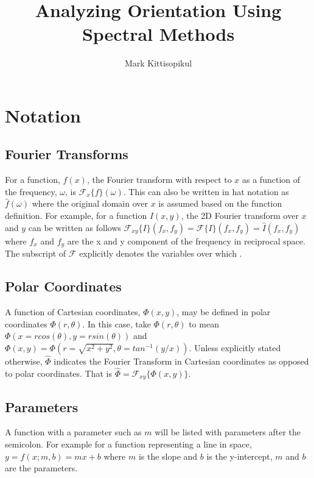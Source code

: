 \documentclass{article}
\title{Analyzing Orientation Using Spectral Methods}
\author{Mark Kittisopikul}
\begin{document}
\maketitle

\section{Notation}
\subsection{Fourier Transforms}
For a function, $f(x)$, the Fourier transform with respect to $ x $ as a function of the frequency, $ \omega $, is $ \mathcal{F}_x\{f\}(\omega) $. This can also be written in hat notation as $ \hat{f}(\omega) $ where the original domain over $ x $ is assumed based on the function definition. For example, for a function $ I(x,y) $, the 2D Fourier transform over $ x $ and $ y $ can be written as follows $ \mathcal{F}_{xy}\{I\}(f_x,f_y) = \mathcal{F}\{I\}(f_x,f_y) = \widehat{I}(f_x,f_y) $ where $ f_x $ and $ f_y $ are the x and y component of the frequency in reciprocal space. The subscript of $ \mathcal{F} $ explicitly denotes the variables over which .

\subsection{Polar Coordinates}
A function of Cartesian coordinates, $ \Phi(x,y) $, may be defined in polar coordinates $ \Phi(r,\theta) $. In this case, take $ \Phi(r,\theta) $ to mean $\Phi(x = r cos(\theta),y = r sin(\theta) ) $ and $ \Phi(x,y) = \Phi(r = \sqrt{x^2+y^2},\theta = tan^{-1}(y/x)) $. Unless explicitly stated otherwise, $ \widehat{\Phi} $ indicates the Fourier Transform in Cartesian coordinates as opposed to polar coordinates. That is $ \widehat{\Phi} = \mathcal{F}_{xy}\{\Phi(x,y)\} $.

\subsection{Parameters}
A function with a parameter such as $ m $ will be listed with parameters after the semicolon. For example for a function representing a line in space, $ y = f(x; m,b) = mx+b $ where $ m $ is the slope and $ b $ is the y-intercept, $ m $ and $ b $ are the parameters.
\end{document}
